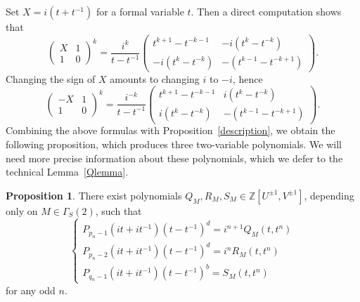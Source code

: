 \documentclass{amsart}
\newcommand{\Z}{\mathbb{Z}}
\theoremstyle{definition}
\newtheorem{Proposition}[Theorem]{Proposition}
\begin{document}
Set $X= i(t+t^{-1})$ for a formal variable $t$. Then a direct computation shows that 
\begin{equation}
\label{eqn.power}
    \begin{pmatrix} X& 1 \\ 1 & 0\end{pmatrix}^k=\frac{i^k}{t-t^{-1}}\begin{pmatrix} t^{k+1}-t^{-k-1}& -i(t^{k}-t^{-k}) \\ -i(t^{k}-t^{-k}) & -(t^{k-1}-t^{-k+1})\end{pmatrix} .
\end{equation}
Changing the sign of $X$ amounts to changing $i$ to $-i$, hence
\begin{equation}
\label{eqn.power2}
    \begin{pmatrix}-X& 1 \\ 1 & 0\end{pmatrix}^k=\frac{i^{-k}}{t-t^{-1}}\begin{pmatrix} t^{k+1}-t^{-k-1}& i(t^{k}-t^{-k}) \\ i(t^{k}-t^{-k}) & -(t^{k-1}-t^{-k+1})\end{pmatrix} .
\end{equation}
Combining the above formulas with Proposition~\ref{description}, we obtain the following proposition, which produces three two-variable polynomials. We will need more precise information about these polynomials, which we defer to the technical Lemma~\ref{Qlemma}. 
\begin{Proposition}\label{changevariable}
There exist polynomials $Q_{M},R_{M},S_M\in \Z[U^{\pm 1},V^{\pm 1}]$, depending only on $M \in \Gamma_S(2)$, such that 
$$\begin{cases}P_{p_n-1}(it+it^{-1})(t-t^{-1})^d=i^{n+1}Q_{M}(t,t^n)\\
P_{p_n-2}(it+it^{-1})(t-t^{-1})^d=i^{n}R_{M}(t,t^n)\\
P_{q_n-1}(it+it^{-1})(t-t^{-1})^b=S_{M}(t,t^n)
\end{cases}$$
for any odd $n$.
\end{Proposition}
\end{document}
